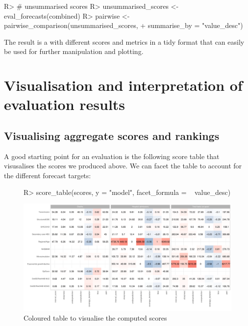 \documentclass[article,shortnames]{jss}
\begin{document}
\begin{Schunk}
\begin{Sinput}
R> # unsummarised scores
R> unsummarised_scores <- eval_forecasts(combined)
R> pairwise <- pairwise_comparison(unsummarised_scores, 
+                                  summarise_by = "value_desc")
\end{Sinput}
\end{Schunk}

The result is a  with different scores and metrics in a tidy format that can easily be used for further manipulation and plotting. 

\section{Visualisation and interpretation of evaluation results}

\subsection{Visualising aggregate scores and rankings}
A good starting point for an evaluation is the following score table that visusalises the scores we produced above. We can facet the table to account for the different forecast targets: 

\begin{figure}[h]
\centering
\begin{Schunk}
\begin{Sinput}
R> score_table(scores, y = "model", facet_formula = ~ value_desc)
\end{Sinput}
\end{Schunk}
\includegraphics{plots/plot-score-table}
\caption{\label{fig:score-table} Coloured table to visualise the computed scores}
\end{figure}
\end{document}
